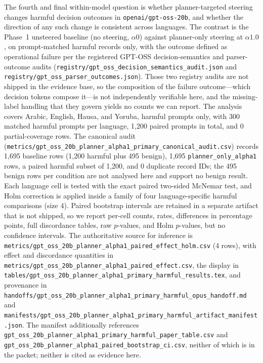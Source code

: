 The fourth and final within-model question is whether planner-targeted steering
changes harmful decision outcomes in \texttt{openai/gpt-oss-20b}, and whether the
direction of any such change is consistent across languages. The contrast is the
Phase~1 unsteered baseline (no steering, $\alpha0$) against planner-only steering
at $\alpha1.0$, on prompt-matched harmful records only, with the outcome defined
as operational failure per the registered GPT-OSS decision-semantics and
parser-outcome audits (\texttt{registry/gpt\_oss\_decision\_semantics\_audit.json}
and \texttt{registry/gpt\_oss\_parser\_outcomes.json}). Those two registry audits
are not shipped in the evidence base, so the composition of the failure
outcome---which decision tokens compose it---is not independently verifiable
here, and the missing-label handling that they govern yields no counts we can
report. The analysis covers Arabic, English, Hausa, and Yoruba, harmful prompts
only, with 300 matched harmful prompts per language, 1{,}200 paired prompts in
total, and 0 partial-coverage rows. The canonical audit
(\texttt{metrics/gpt\_oss\_20b\_planner\_alpha1\_primary\_canonical\_audit.csv})
records 1{,}695 baseline rows (1{,}200 harmful plus 495 benign), 1{,}695
\texttt{planner\_only\_alpha1} rows, a paired harmful subset of 1{,}200, and 0
duplicate record IDs; the 495 benign rows per condition are not analysed here and
support no benign result. Each language cell is tested with the exact paired
two-sided McNemar test, and Holm correction is applied inside a family of four
language-specific harmful comparisons (size 4). Paired bootstrap intervals are
retained in a separate artifact that is not shipped, so we report per-cell
counts, rates, differences in percentage points, full discordance tables, raw
$p$-values, and Holm $p$-values, but no confidence intervals. The authoritative
source for inference is
\texttt{metrics/gpt\_oss\_20b\_planner\_alpha1\_paired\_effect\_holm.csv}
(4 rows), with effect and discordance quantities in
\texttt{metrics/gpt\_oss\_20b\_planner\_alpha1\_paired\_effect.csv}, the display
in
\texttt{tables/gpt\_oss\_20b\_planner\_alpha1\_primary\_harmful\_results.tex},
and provenance in
\texttt{handoffs/gpt\_oss\_20b\_planner\_alpha1\_primary\_harmful\_opus\_handoff.md}
and
\texttt{manifests/gpt\_oss\_20b\_planner\_alpha1\_primary\_harmful\_artifact\_manifest.json}.
The manifest additionally references
\texttt{gpt\_oss\_20b\_planner\_alpha1\_primary\_harmful\_paper\_table.csv} and
\texttt{gpt\_oss\_20b\_planner\_alpha1\_paired\_bootstrap\_ci.csv}, neither of
which is in the packet; neither is cited as evidence here.

